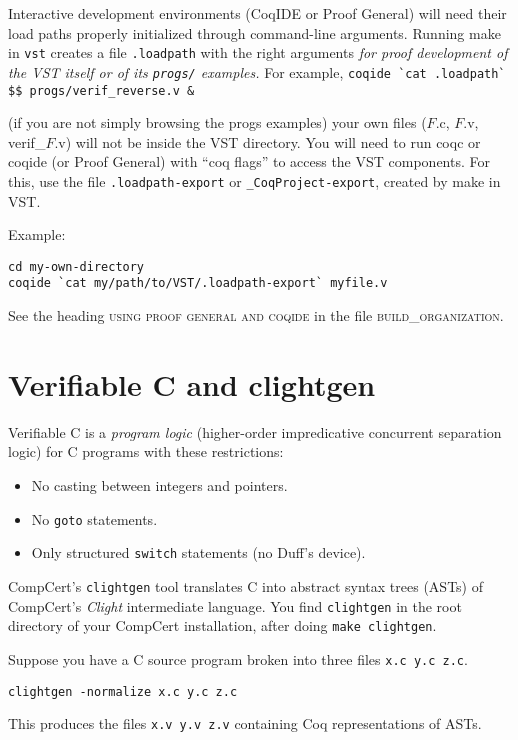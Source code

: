\documentclass[12pt,fleqn,openany,oneside,showtrims]{memoir}
\begin{document}
\label{loadpaths}
Interactive development environments (CoqIDE or Proof General)
will need their load paths properly initialized through
command-line arguments.  Running \textsf{make} in
\lstinline{vst} creates a file \lstinline{.loadpath} with
the right arguments \emph{for proof development of the VST itself
or of its \lstinline{progs/} examples.}
For example,
\newline
\lstinline{coqide `cat .loadpath` $$ progs/verif_reverse.v &}

(if you are not simply browsing the \textsf{progs} examples)
your own files ($F$.c, $F$.v, verif\_$F$.v) will not be inside
the VST directory.  You will need to run coqc or coqide (or Proof General)
with ``coq flags'' to access the VST components.  For this, use
the file \lstinline{.loadpath-export} or \lstinline{_CoqProject-export},
created by \textsf{make} in VST.

Example:
\begin{lstlisting}
cd my-own-directory
coqide `cat my/path/to/VST/.loadpath-export` myfile.v
\end{lstlisting}


See the heading
\textsc{using proof general and coqide}
in the file \textsc{build\_organization}.

\chapter{Verifiable C and \textsf{clightgen}}
\label{refcard:verifiable-c}
Verifiable C is a \emph{program logic} (higher-order impredicative concurrent separation logic) for C programs with these restrictions:
\begin{itemize}
  \item No casting between integers and pointers.
  \item No \lstinline{goto} statements.
  \item Only structured \lstinline{switch} statements (no Duff's device).
\end{itemize}

CompCert's \lstinline{clightgen} tool
translates C into
abstract syntax trees (ASTs) of
CompCert's \emph{Clight} intermediate language.
You find \lstinline{clightgen} in the root directory of your CompCert installation, after doing \lstinline{make clightgen}.

Suppose you have a C source program broken into three files
\lstinline{x.c y.c z.c}.
\begin{lstlisting}
clightgen -normalize x.c y.c z.c
\end{lstlisting}
\vspace{-\baselineskip}
This produces the files \lstinline{x.v y.v z.v} containing Coq representations of ASTs.
\end{document}
